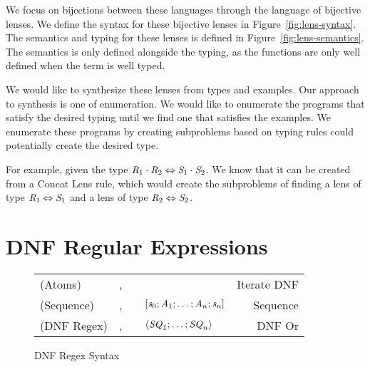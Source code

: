 We focus on bijections between these languages through the language of
bijective lenses.
We define the syntax for these bijective lenses in Figure~\ref{fig:lens-syntax}.
The semantics and typing for these lenses is defined in Figure~\ref{fig:lens-semantics}.
The semantics is only defined alongside the typing, as the functions are only
well defined when the term is well typed.

We would like to synthesize these lenses from types and examples.
Our approach to synthesis is one of enumeration.
We would like to enumerate the programs that satisfy the desired typing until
we find one that satisfies the examples.
We enumerate these programs by creating subproblems based on typing rules
could potentially create the desired type.

For example, given the type $\mathit{R}_1\cdot\mathit{R}_2\Leftrightarrow\mathit{S}_1\cdot\mathit{S}_2$.
We know that it can be created from a Concat Lens rule,
which would create the subproblems of finding a lens of type $\mathit{R}_1\Leftrightarrow\mathit{S}_1$
and a lens of type $\mathit{R}_2\Leftrightarrow\mathit{S}_2$.

\section{DNF Regular Expressions}

\begin{figure}
\begin{tabular}{l@{\ }l@{\ }c@{\ }l@{\ }r}

(Atoms)& \Atom{},\AtomAlt{} & \GEq{} & \StarOf{\DNFRegex{}} & Iterate DNF\\
(Sequence)& \Sequence{},\SequenceAlt{} & \GEq{} &
$[\mathit{s}_0;\mathit{A}_1;\ldots;\mathit{A}_n;\mathit{s}_n]$ & Sequence\\
(DNF Regex)& \DNFRegex{},\DNFRegexAlt{} & \GEq{} & $\langle\mathit{SQ}_1;\ldots;\mathit{SQ}_n\rangle$ & DNF Or\\
\end{tabular}
\caption{DNF Regex Syntax} 
\label{fig:dnf-regex-syntax}
\end{figure}

